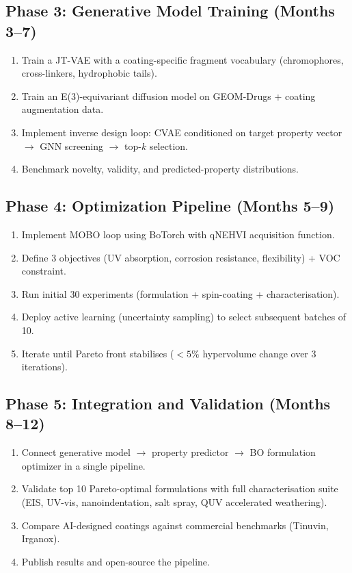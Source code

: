 \documentclass[11pt,a4paper]{article}
\begin{document}
\subsection{Phase 3: Generative Model Training (Months 3--7)}
\begin{enumerate}[nosep]
  \item Train a JT-VAE with a coating-specific fragment vocabulary (chromophores, cross-linkers, hydrophobic tails).
  \item Train an E(3)-equivariant diffusion model on GEOM-Drugs + coating augmentation data.
  \item Implement inverse design loop: CVAE conditioned on target property vector $\to$ GNN screening $\to$ top-$k$ selection.
  \item Benchmark novelty, validity, and predicted-property distributions.
\end{enumerate}

\subsection{Phase 4: Optimization Pipeline (Months 5--9)}
\begin{enumerate}[nosep]
  \item Implement MOBO loop using BoTorch with qNEHVI acquisition function.
  \item Define 3 objectives (UV absorption, corrosion resistance, flexibility) + VOC constraint.
  \item Run initial 30 experiments (formulation + spin-coating + characterisation).
  \item Deploy active learning (uncertainty sampling) to select subsequent batches of 10.
  \item Iterate until Pareto front stabilises ($<5\%$ hypervolume change over 3 iterations).
\end{enumerate}

\subsection{Phase 5: Integration and Validation (Months 8--12)}
\begin{enumerate}[nosep]
  \item Connect generative model $\to$ property predictor $\to$ BO formulation optimizer in a single pipeline.
  \item Validate top 10 Pareto-optimal formulations with full characterisation suite (EIS, UV-vis, nanoindentation, salt spray, QUV accelerated weathering).
  \item Compare AI-designed coatings against commercial benchmarks (Tinuvin, Irganox).
  \item Publish results and open-source the pipeline.
\end{enumerate}
\end{document}
